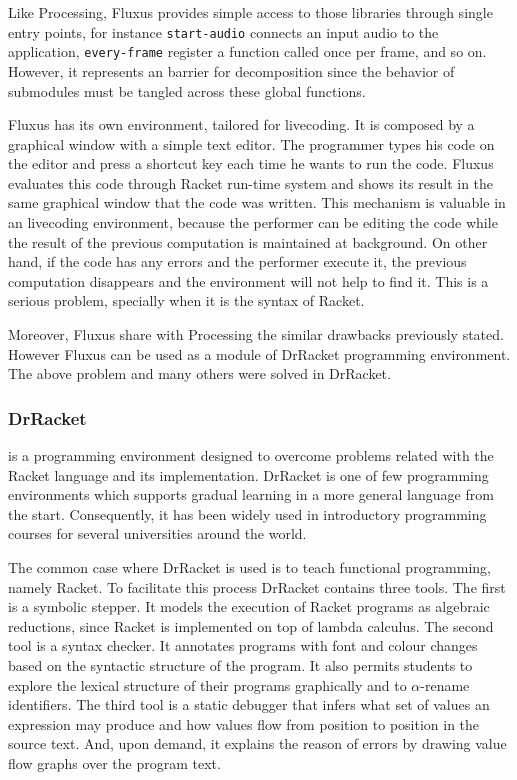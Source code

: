 Like Processing, Fluxus provides simple access to those libraries through single entry points, for instance \texttt{start-audio} connects an input audio to the application, \texttt{every-frame} register a function called once per frame, and so on. However, it represents an barrier for decomposition since the behavior of submodules must be tangled across these global functions.

Fluxus has its own environment, tailored for livecoding. It is composed by a graphical window with a simple text editor. The programmer types his code on the editor and press a shortcut key each time he wants to run the code. Fluxus evaluates this code through Racket run-time system and shows its result in the same graphical window that the code was written. This mechanism is valuable in an livecoding environment, because the performer can be editing the code while the result of the previous computation is maintained at background. On other hand, if the code has any errors and the performer execute it, the previous computation disappears and the environment will not help to find it. This is a serious problem, specially when it is the syntax of Racket.

Moreover, Fluxus share with Processing the similar drawbacks previously stated. However Fluxus can be used as a module of DrRacket programming environment. The above problem and many others were solved in DrRacket.
\subsubsection{DrRacket~\cite{findler2002drscheme}} is a programming environment designed to overcome problems related with the Racket language and its implementation. DrRacket is one of few programming environments which supports gradual learning in a more general language from the start. Consequently, it has been widely used in introductory programming courses for several universities around the world.

The common case where DrRacket is used is to teach functional programming, namely Racket. To facilitate this process DrRacket contains three tools. The first is a symbolic stepper. It models the execution of Racket programs as algebraic reductions, since Racket is implemented on top of lambda calculus. The second tool is a syntax checker. It annotates programs with font and colour changes based on the syntactic structure of the program. It also permits students to explore the lexical structure of their programs graphically and to $\alpha$-rename identifiers. The third tool is a static debugger that infers what set of values an expression may produce and how values flow from position to position in the source text. And, upon demand, it explains the reason of errors by drawing value flow graphs over the program text.

